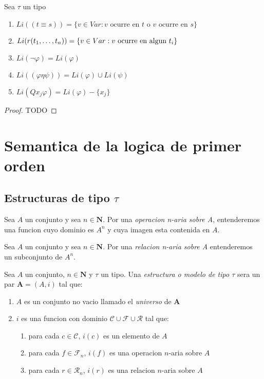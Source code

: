 \begin{lemma}
  Sea $\tau$ un tipo
  \begin{enumerate}
    \item $Li((t\equiv s)) = \{v \in Var : v \text{ ocurre en } t \text{ o } v \text{ ocurre en } s\}$
    \item $Li(r(t_{1}, \dots, t_{n})) = \{v \in Var : v \text{ ocurre en algun } t_i\}$
    \item $Li(\neg\varphi) = Li(\varphi)$
    \item $Li((\varphi\eta\psi)) = Li(\varphi) \cup Li(\psi)$
    \item $Li(Qx_j\varphi) = Li(\varphi) - \{x_j\}$
  \end{enumerate}
\end{lemma}
\begin{proof}
  TODO
\end{proof}

\section{Semantica de la logica de primer orden}

\subsection{Estructuras de tipo $\tau$}
\begin{definition}
  Sea $A$ un conjunto y sea $n \in \mathbf{N}$. Por una \emph{operacion n-aria sobre A}, entenderemos
  una funcion cuyo dominio es $A^n$ y cuya imagen esta contenida en $A$.
\end{definition}

\begin{definition}
  Sea $A$ un conjunto y sea $n \in \mathbf{N}$. Por una \emph{relacion n-aria sobre A} entenderemos un subconjunto de $A^n$.
\end{definition}

\begin{definition}
  Sea $A$ un conjunto, $n \in \mathbf{N}$ y $\tau$ un tipo. Una \emph{estructura o modelo de tipo $\tau$} sera un par $\mathbf{A} = (A, i)$ tal que:
  \begin{enumerate}
    \item $A$ es un conjunto no vacio llamado el \emph{universo} de $\mathbf{A}$
    \item $i$ es una funcion con dominio $\mathcal{C} \cup \mathcal{F} \cup \mathcal{R}$ tal que: \begin{enumerate}
      \item para cada $c \in \mathcal{C}$, $i(c)$ es un elemento de $A$
      \item para cada $f \in \mathcal{F}_n$, $i(f)$ es una operacion $n$-aria sobre $A$
      \item para cada $r \in \mathcal{R}_n$, $i(r)$ es una relacion $n$-aria sobre $A$
    \end{enumerate}
  \end{enumerate}
\end{definition}

